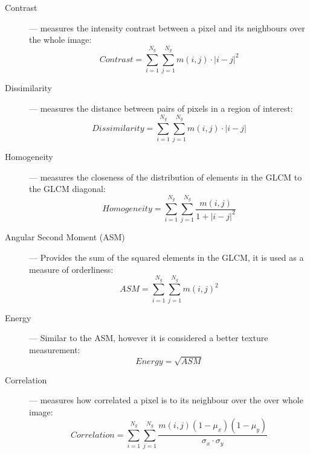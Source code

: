 \documentclass[../main.tex]{subfile}
\begin{document}
\begin{description}
    \item[Contrast] --- measures the intensity contrast between a pixel and its neighbours over the whole image:
          \begin{equation}
              Contrast = \sum^{N_{g}}_{i=1} \sum^{N_{g}}_{j=1} m(i,j) \cdot \lvert i - j \rvert^{2}
              \label{eq:contrast}
          \end{equation}

    \item[Dissimilarity] --- measures the distance between pairs of \mbox{pixels} in a region of interest:
          \begin{equation}
              Dissimilarity = \sum^{N_{g}}_{i=1} \sum^{N_{g}}_{j=1} m(i,j) \cdot \lvert i - j \rvert
              \label{eq:dissimilarity}
          \end{equation}

    \item[Homogeneity] --- measures the closeness of the distribution of elements in the GLCM to the GLCM diagonal:
          \begin{equation}
              Homogeneity = \sum^{N_{g}}_{i=1} \sum^{N_{g}}_{j=1} \frac{m(i,j)}{1 + \lvert i - j \rvert^{2}}
              \label{eq:homogeneity}
          \end{equation}

    \item[Angular Second Moment (ASM)] --- Provides the sum of the squared elements in the GLCM, it is used as a measure of orderliness:
          \begin{equation}
              ASM = \sum^{N_{g}}_{i=1} \sum^{N_{g}}_{j=1} m(i,j)^{2}
              \label{eq:asm}
          \end{equation}

    \item[Energy] --- Similar to the ASM, however it is considered a better texture measurement:
          \begin{equation}
              Energy = \sqrt{ASM}
              \label{eq:energy}
          \end{equation}

    \item[Correlation] --- measures how correlated a pixel  is to its neighbour over the over whole image:
          \begin{equation}
              Correlation = \sum^{N_{g}}_{i=1} \sum^{N_{g}}_{j=1} \frac{m(i,j) \left(1 - \mu_{x}\right) \left(1 - \mu_{y}\right)}{\sigma_{x} \cdot \sigma_{y}}
              \label{eq:correlation}
          \end{equation}
\end{description}
\end{document}
